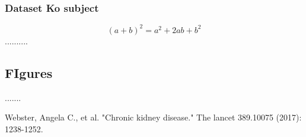 \documentclass[a4paper,conference]{IEEEtran}
\begin{document}
\subsubsection{Dataset Ko subject}

\begin{equation}
    (a+b)^{2}= a^{2}+2ab+b^{2}
\end{equation}
..........
\subsection{FIgures}
.......



\begin{thebibliography}{00}
 Webster, Angela C., et al. "Chronic kidney disease." The lancet 389.10075 (2017): 1238-1252.

\end{thebibliography}
\end{document}
